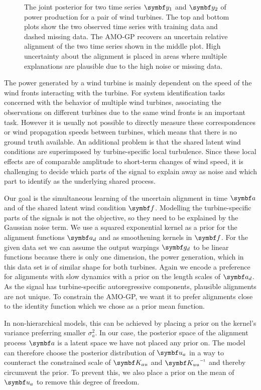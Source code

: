 \begin{figure}[tp]
    \centering
    \caption{
        \label{fig:alignment:wind_joint_model}
        The joint posterior for two time series $\rv{y}_1$ and $\rv{y}_2$ of power production for a pair of wind turbines.
        The top and bottom plots show the two observed time series with training data and dashed missing data.
        The AMO-GP recovers an uncertain relative alignment of the two time series shown in the middle plot.
        High uncertainty about the alignment is placed in areas where multiple explanations are plausible due to the high noise or missing data.
    }
\end{figure}
The power generated by a wind turbine is mainly dependent on the speed of the wind fronts interacting with the turbine.
For system identification tasks concerned with the behavior of multiple wind turbines, associating the observations on different turbines due to the same wind fronts is an important task.
However it is usually not possible to directly measure these correspondences or wind propagation speeds between turbines, which means that there is no ground truth available.
An additional problem is that the shared latent wind conditions are superimposed by turbine-specific local turbulence.
Since these local effects are of comparable amplitude to short-term changes of wind speed, it is challenging to decide which parts of the signal to explain away as noise and which part to identify as the underlying shared process.

Our goal is the simultaneous learning of the uncertain alignment in time $\rv{a}$ and of the shared latent wind condition $\rv{f}$.
Modelling the turbine-specific parts of the signals is not the objective, so they need to be explained by the Gaussian noise term.
We use a squared exponential kernel as a prior for the alignment functions $\rv{a}_d$ and as smoothening kernels in $\rv{f}$.
For the given data set we can assume the output warpings $\rv{g}_d$ to be linear functions because there is only one dimension, the power generation, which in this data set is of similar shape for both turbines.
Again we encode a preference for alignments with slow dynamics with a prior on the length scales of $\rv{a}_d$.
As the signal has turbine-specific autoregressive components, plausible alignments are not unique.
To constrain the AMO-GP, we want it to prefer alignments close to the identity function which we chose as a prior mean function.

In non-hierarchical models, this can be achieved by placing a prior on the kernel's variance preferring smaller $\sigma_a^2$.
In our case, the posterior space of the alignment process $\rv{a}$ is a latent space we have not placed any prior on.
The model can therefore choose the posterior distribution of $\rv{u}_a$ in a way to counteract the constrained scale of $\mat{K_{au}}$ and $\mat{K_{uu}}\inv$ and thereby circumvent the prior.
To prevent this, we also place a prior on the mean of $\rv{u}_a$ to remove this degree of freedom.

